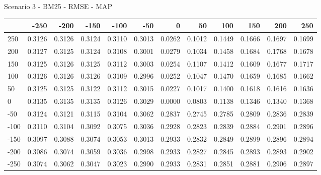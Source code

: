Scenario 3 - BM25 - RMSE - MAP
\begin{tabular}{lrrrrrrrrrrr}
\toprule
{} &   -250 &   -200 &   -150 &   -100 &   -50  &    0   &    50  &    100 &    150 &    200 &    250 \\
\midrule
 250 & 0.3126 & 0.3126 & 0.3124 & 0.3110 & 0.3013 & 0.0262 & 0.1012 & 0.1449 & 0.1666 & 0.1697 & 0.1699 \\
 200 & 0.3127 & 0.3125 & 0.3124 & 0.3108 & 0.3001 & 0.0279 & 0.1034 & 0.1458 & 0.1684 & 0.1768 & 0.1678 \\
 150 & 0.3125 & 0.3126 & 0.3125 & 0.3112 & 0.3003 & 0.0254 & 0.1107 & 0.1412 & 0.1609 & 0.1677 & 0.1717 \\
 100 & 0.3126 & 0.3126 & 0.3126 & 0.3109 & 0.2996 & 0.0252 & 0.1047 & 0.1470 & 0.1659 & 0.1685 & 0.1662 \\
 50  & 0.3125 & 0.3125 & 0.3122 & 0.3112 & 0.3015 & 0.0227 & 0.1017 & 0.1400 & 0.1618 & 0.1616 & 0.1636 \\
 0   & 0.3135 & 0.3135 & 0.3135 & 0.3126 & 0.3029 & 0.0000 & 0.0803 & 0.1138 & 0.1346 & 0.1340 & 0.1368 \\
-50  & 0.3124 & 0.3121 & 0.3115 & 0.3104 & 0.3062 & 0.2837 & 0.2745 & 0.2785 & 0.2809 & 0.2836 & 0.2839 \\
-100 & 0.3110 & 0.3104 & 0.3092 & 0.3075 & 0.3036 & 0.2928 & 0.2823 & 0.2839 & 0.2884 & 0.2901 & 0.2896 \\
-150 & 0.3097 & 0.3088 & 0.3074 & 0.3053 & 0.3013 & 0.2933 & 0.2832 & 0.2849 & 0.2899 & 0.2896 & 0.2894 \\
-200 & 0.3086 & 0.3074 & 0.3059 & 0.3036 & 0.2998 & 0.2933 & 0.2827 & 0.2845 & 0.2893 & 0.2893 & 0.2902 \\
-250 & 0.3074 & 0.3062 & 0.3047 & 0.3023 & 0.2990 & 0.2933 & 0.2831 & 0.2851 & 0.2881 & 0.2906 & 0.2897 \\
\bottomrule
\end{tabular}

